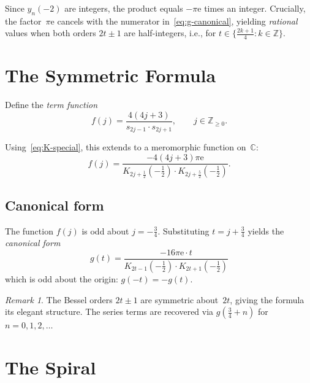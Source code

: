 \documentclass[11pt]{article}
\theoremstyle{definition}
\theoremstyle{remark}
\newtheorem{remark}[theorem]{Remark}
\newcommand{\ee}{\mathrm{e}}
\newcommand{\C}{\mathbb{C}}
\newcommand{\Z}{\mathbb{Z}}
\begin{document}
Since $y_n(-2)$ are integers, the product equals $-\pi\ee$ times an integer.
Crucially, the factor~$\pi\ee$ cancels with the numerator in~\eqref{eq:g-canonical},
yielding \emph{rational} values when both orders $2t \pm 1$ are half-integers,
i.e., for $t \in \{\frac{2k+1}{4} : k \in \Z\}$.

\section{The Symmetric Formula}

Define the \emph{term function}
\begin{equation}\label{eq:term-j}
f(j) = \frac{4(4j+3)}{s_{2j-1} \cdot s_{2j+1}}, \qquad j \in \Z_{\geq 0}.
\end{equation}

Using~\eqref{eq:K-special}, this extends to a meromorphic function on~$\C$:
\begin{equation}\label{eq:f-bessel}
f(j) = \frac{-4(4j+3)\pi\ee}
       {K_{2j+\frac{1}{2}}\!\left(-\tfrac{1}{2}\right) \cdot
        K_{2j+\frac{5}{2}}\!\left(-\tfrac{1}{2}\right)}.
\end{equation}

\subsection{Canonical form}

The function $f(j)$ is odd about $j = -\frac{3}{4}$. Substituting
$t = j + \frac{3}{4}$ yields the \emph{canonical form}
\begin{equation}\label{eq:g-canonical}
\boxed{g(t) = \frac{-16\pi\ee \cdot t}
       {K_{2t-1}\!\left(-\tfrac{1}{2}\right) \cdot K_{2t+1}\!\left(-\tfrac{1}{2}\right)}}
\end{equation}
which is odd about the origin: $g(-t) = -g(t)$.

\begin{remark}
The Bessel orders $2t \pm 1$ are symmetric about~$2t$, giving the formula
its elegant structure. The series terms are recovered via $g(\frac{3}{4} + n)$
for $n = 0, 1, 2, \ldots$
\end{remark}

\section{The Spiral}
\end{document}
